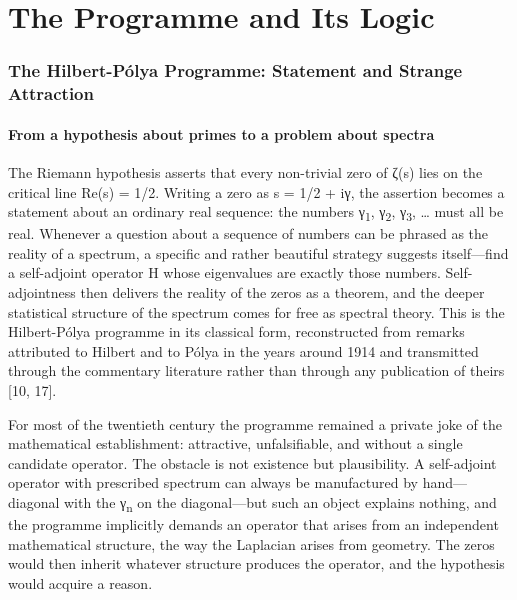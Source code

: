 \documentclass[10pt]{article}
\begin{document}
\begin{abstract}
\smallskip\noindent\textbf{Ключевые слова:} \emph{дзета-функция Римана; программа Гильберта-Польи; решётка Ахаронова-Бома; гауссов унитарный ансамбль; спектральная статистика; топологические инварианты; вычислительная теория чисел}

\smallskip\noindent\textbf{Data and code availability.} All source code, the complete run archive (\texttt{run\_20260914\_234626}), and the per-probe artefacts are openly available at \url{https://github.com/wild8highlander/ab-cloud-research}; the archived dataset carries DOI \url{https://doi.org/10.5281/zenodo.21825394}.
\end{abstract}

\newpage
\tableofcontents
\newpage
\part*{The Programme and Its Logic}
\section{The Hilbert-Pólya Programme: Statement and Strange Attraction}\label{sec:ch1}
\subsection{From a hypothesis about primes to a problem about spectra}\label{sec:11}
The Riemann hypothesis asserts that every non-trivial zero of ζ(s) lies on the critical line Re(s) = 1/2. Writing a zero as s = 1/2 + iγ, the assertion becomes a statement about an ordinary real sequence: the numbers γ\textsubscript{1}, γ\textsubscript{2}, γ\textsubscript{3}, … must all be real. Whenever a question about a sequence of numbers can be phrased as the reality of a spectrum, a specific and rather beautiful strategy suggests itself---find a self-adjoint operator H whose eigenvalues are exactly those numbers. Self-adjointness then delivers the reality of the zeros as a theorem, and the deeper statistical structure of the spectrum comes for free as spectral theory. This is the Hilbert-Pólya programme in its classical form, reconstructed from remarks attributed to Hilbert and to Pólya in the years around 1914 and transmitted through the commentary literature rather than through any publication of theirs [10, 17].

For most of the twentieth century the programme remained a private joke of the mathematical establishment: attractive, unfalsifiable, and without a single candidate operator. The obstacle is not existence but plausibility. A self-adjoint operator with prescribed spectrum can always be manufactured by hand---diagonal with the γ\textsubscript{n} on the diagonal---but such an object explains nothing, and the programme implicitly demands an operator that arises from an independent mathematical structure, the way the Laplacian arises from geometry. The zeros would then inherit whatever structure produces the operator, and the hypothesis would acquire a reason.
\end{document}
